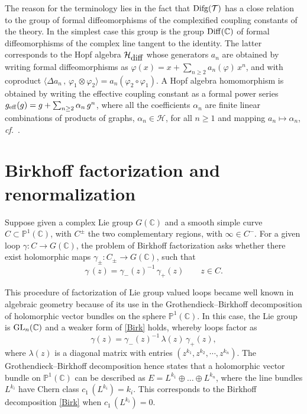 \documentclass[10pt]{amsart}
\def\C{{\mathbb C}}
\renewcommand{\P}{{\mathbb P}}
\def\Hc{{\mathcal H}}
\def\sT{{\mathcal T}}
\def\g{\gamma}
\def\D{\Delta}
\def\vp{\varphi}
\def\lgl{\langle}
\def\op{\oplus}
\def\ot{\otimes}
\def\rgl{\rangle}
\def\sbs{\subset}
\def\text{\hbox}
\def\GL{{\rm GL}}
\newcommand{\cf}{{\it cf.\/}\ }
\numberwithin{equation}{section}
\begin{document}
\smallskip

The reason for the terminology lies in the fact that ${\rm
Difg}(\sT)$ has a close relation to the group of formal
diffeomorphisms of the complexified coupling constants of the
theory. In the simplest case this group is the group ${\rm
Diff}(\C)$ of formal diffeomorphisms of the complex line tangent
to the identity. The latter corresponds to the Hopf algebra
$\Hc_{\text{diff}}$ whose generators $a_n$ are obtained by writing
formal diffeomorphisms as $ \varphi(x) = x + \sum_{n\geq 2}
a_n(\varphi)\, x^n $, and with coproduct $\lgl \D a_n  \, , \,
\vp_1 \ot \vp_2   \rgl = a_n (\vp_2 \circ \vp_1)$. A Hopf algebra
homomorphism is obtained by writing the effective coupling
constant as a formal power series $g_{{\rm eff}}(g) = g +
\sum_{n\geq 2} \alpha_n \, g^n$,
 where all the coefficients $\alpha_n$ are finite linear combinations
of products of graphs, $\alpha_{n} \in \Hc$, for all $n\geq 1$ and
mapping  $a_n \mapsto \alpha_n$, \cf \cite{CK1}.




\medskip
\section{Birkhoff factorization and
renormalization}\label{SectBirk}

Suppose given a complex Lie group  $G(\C)$ and a smooth simple
curve $C\sbs \P^1 (\C)$, with $C^\pm$ the two complementary
regions, with $\infty\in C^-$. For a given loop $\g : C \to
G(\C)$, the problem of Birkhoff factorization asks whether there
exist holomorphic maps $\g_{\pm} : C_{\pm} \to G(\C)$, such that
\begin{equation}\label{Birk}
\g \, (z) = \g_- (z)^{-1} \, \g_+ (z) \qquad z \in C .
\end{equation}

\smallskip

This procedure of factorization of Lie group valued loops
became well known in algebraic geometry because of its use in the
Grothendieck--Birkhoff decomposition \cite{Gro1} of holomorphic vector
bundles on the sphere $\P^1(\C)$.
In this case, the Lie group is $\GL_n(\C)$ and
a weaker form of \eqref{Birk} holds, whereby loops factor as
\begin{equation}\label{BirkL}
\gamma(z) = \gamma_-(z)^{-1}\, \lambda(z)\, \gamma_+(z),
\end{equation}
where $ \lambda(z)$ is a diagonal matrix with entries
$(z^{k_1},z^{k_2},\cdots,z^{k_n})$.
The Grothendieck--Birkhoff decomposition hence states that a
holomorphic vector bundle on $\P^1(\C)$ can be described as
$E = L^{k_1} \op \ldots \op L^{k_n}$,
where the line bundles $L^{k_i}$ have Chern class $c_1 \, (L^{k_i})
=k_i$. This corresponds to the Birkhoff decomposition \eqref{Birk}
when $c_1 \, (L^{k_i}) = 0$.
\end{document}
